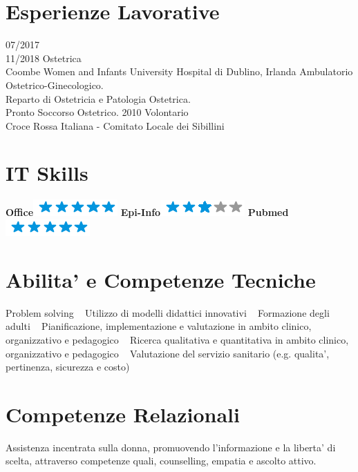 \documentclass[11pt]{friggeri-cv}
\begin{document}
\vspace{-35pt}
\section{Esperienze Lavorative}
\begin{entrylist}
  \entry
  {07/2017\\11/2018}
  {Ostetrica}
  {\\Coombe Women and Infants University Hospital di Dublino, Irlanda}
  {Ambulatorio Ostetrico-Ginecologico.\\
    Reparto di Ostetricia e Patologia Ostetrica.\\
    Pronto Soccorso Ostetrico.}
  \entry
  {2010}
  {Volontario}
  {\\Croce Rossa Italiana - Comitato Locale dei Sibillini}
  {}
\end{entrylist}
\vspace{-10pt}
\begin{aside}
  \section{IT Skills}
  \textbf{Office}\includegraphics[scale=0.40]{img/5stars.png}
  \textbf{Epi-Info}\includegraphics[scale=0.40]{img/3stars.png}
  \textbf{Pubmed}\includegraphics[scale=0.40]{img/5stars.png}
  \section{Abilita' e Competenze Tecniche}\footnotesize{
    Problem solving 
    ~
    Utilizzo di modelli didattici innovativi
    ~
    Formazione degli adulti
    ~
    Pianificazione, implementazione e valutazione in ambito clinico, organizzativo e 
    pedagogico 
    ~
    Ricerca qualitativa e quantitativa in ambito clinico, organizzativo e pedagogico 
    ~
    Valutazione del servizio sanitario (e.g. qualita', pertinenza, sicurezza e 
    costo)}
  \section{Competenze Relazionali}\footnotesize{
  Assistenza incentrata sulla donna, promuovendo l'informazione e la 
  liberta' di scelta, attraverso competenze quali, counselling, empatia e 
  ascolto attivo.}
\end{aside}
\end{document}
